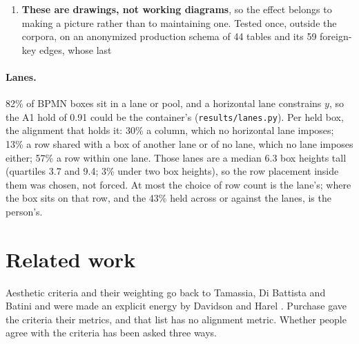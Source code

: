 \documentclass[11pt]{article}
\begin{document}
\begin{enumerate}
  term the energy lacks either way; for the word ``optimise'' it does, and the claim here
  is about the layouts, not the muscle. Separating them needs a guide-free editor or an
  interaction log, and these corpora carry neither. The nearest evidence is the restored
  HOLA corpus: drawings from a study tool, not a commercial editor, hold alignment at
  0.50, so the phenomenon does not need Signavio to appear. The eras say the same
  (\texttt{results/era.md}): the GD Collection holds A1 at 0.81 in 1998 to 2005, when
  its figures came from xfig, Ipe and hand-coded PostScript with no shared guide, 0.60
  in 2006 to 2014 and 0.95 in the TikZ years, where a typed coordinate is alignment
  chosen by hand; and WikiPathways is flat at 0.47 to 0.53 across four generations of
  WP numbers, so no gradient follows PathVisio's releases. No single editor's aid
  produces the hold; what stays open is only whether some aid does in each era.

\item \textbf{These are drawings, not working diagrams}, so the effect belongs to making a
  picture rather than to maintaining one. Tested once, outside the corpora, on an
  anonymized production schema of 44 tables and its 59 foreign-key edges, whose last
\end{enumerate}

\paragraph{Lanes.} 82\% of BPMN boxes sit in a lane or pool, and a horizontal lane
constrains $y$, so the A1 hold of 0.91 could be the container's
(\texttt{results/lanes.py}). Per held box, the alignment that holds it: 30\% a column,
which no horizontal lane imposes; 13\% a row shared with a box of another lane or of no
lane, which no lane imposes either; 57\% a row within one lane. Those lanes are a median
6.3 box heights tall (quartiles 3.7 and 9.4; 3\% under two box heights), so the row
placement inside them was chosen, not forced. At most the choice of row count is the
lane's; where the box sits on that row, and the 43\% held across or against the lanes, is
the person's.


\section{Related work}\label{sec:related}


Aesthetic criteria and their weighting go back to Tamassia, Di Battista and Batini
\cite{tdb88} and were made an explicit energy by Davidson and Harel \cite{dh96}. Purchase
\cite{purchase02} gave the criteria their metrics, and that list has no alignment metric.
Whether people agree with the criteria has been asked three ways.
\end{document}
